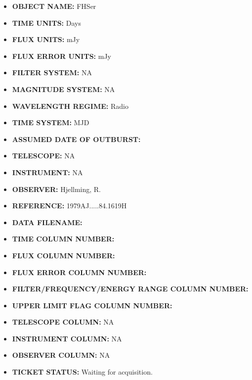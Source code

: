 \documentclass{article}
\begin{document}
\begin{itemize}
\item \textbf{OBJECT NAME:} FHSer
\item \textbf{TIME UNITS:} Days
\item \textbf{FLUX UNITS:} mJy
\item \textbf{FLUX ERROR UNITS:} mJy
\item \textbf{FILTER SYSTEM:} NA
\item \textbf{MAGNITUDE SYSTEM:} NA
\item \textbf{WAVELENGTH REGIME:} Radio
\item \textbf{TIME SYSTEM:} MJD
\item \textbf{ASSUMED DATE OF OUTBURST:}
\item \textbf{TELESCOPE:} NA
\item \textbf{INSTRUMENT:} NA
\item \textbf{OBSERVER:} Hjellming, R.
\item \textbf{REFERENCE:} 1979AJ.....84.1619H
\item \textbf{DATA FILENAME:}
\item \textbf{TIME COLUMN NUMBER:}
\item \textbf{FLUX COLUMN NUMBER:} 
\item \textbf{FLUX ERROR COLUMN NUMBER:} 
\item \textbf{FILTER/FREQUENCY/ENERGY RANGE COLUMN NUMBER:} 
\item \textbf{UPPER LIMIT FLAG COLUMN NUMBER:} 
\item \textbf{TELESCOPE COLUMN:} NA
\item \textbf{INSTRUMENT COLUMN:} NA
\item \textbf{OBSERVER COLUMN:} NA
\item \textbf{TICKET STATUS:} Waiting for acquisition.
\end{itemize}

\end{document}
